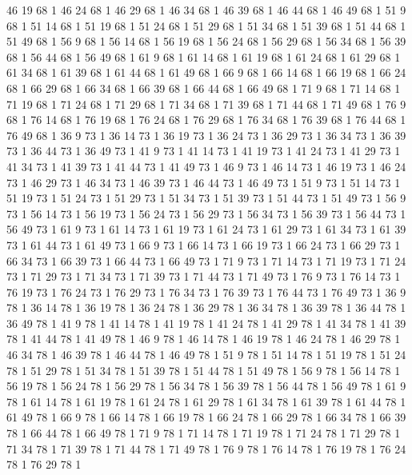 	46	19	68	1
	46	24	68	1
	46	29	68	1
	46	34	68	1
	46	39	68	1
	46	44	68	1
	46	49	68	1
	51	9	68	1
	51	14	68	1
	51	19	68	1
	51	24	68	1
	51	29	68	1
	51	34	68	1
	51	39	68	1
	51	44	68	1
	51	49	68	1
	56	9	68	1
	56	14	68	1
	56	19	68	1
	56	24	68	1
	56	29	68	1
	56	34	68	1
	56	39	68	1
	56	44	68	1
	56	49	68	1
	61	9	68	1
	61	14	68	1
	61	19	68	1
	61	24	68	1
	61	29	68	1
	61	34	68	1
	61	39	68	1
	61	44	68	1
	61	49	68	1
	66	9	68	1
	66	14	68	1
	66	19	68	1
	66	24	68	1
	66	29	68	1
	66	34	68	1
	66	39	68	1
	66	44	68	1
	66	49	68	1
	71	9	68	1
	71	14	68	1
	71	19	68	1
	71	24	68	1
	71	29	68	1
	71	34	68	1
	71	39	68	1
	71	44	68	1
	71	49	68	1
	76	9	68	1
	76	14	68	1
	76	19	68	1
	76	24	68	1
	76	29	68	1
	76	34	68	1
	76	39	68	1
	76	44	68	1
	76	49	68	1
	36	9	73	1
	36	14	73	1
	36	19	73	1
	36	24	73	1
	36	29	73	1
	36	34	73	1
	36	39	73	1
	36	44	73	1
	36	49	73	1
	41	9	73	1
	41	14	73	1
	41	19	73	1
	41	24	73	1
	41	29	73	1
	41	34	73	1
	41	39	73	1
	41	44	73	1
	41	49	73	1
	46	9	73	1
	46	14	73	1
	46	19	73	1
	46	24	73	1
	46	29	73	1
	46	34	73	1
	46	39	73	1
	46	44	73	1
	46	49	73	1
	51	9	73	1
	51	14	73	1
	51	19	73	1
	51	24	73	1
	51	29	73	1
	51	34	73	1
	51	39	73	1
	51	44	73	1
	51	49	73	1
	56	9	73	1
	56	14	73	1
	56	19	73	1
	56	24	73	1
	56	29	73	1
	56	34	73	1
	56	39	73	1
	56	44	73	1
	56	49	73	1
	61	9	73	1
	61	14	73	1
	61	19	73	1
	61	24	73	1
	61	29	73	1
	61	34	73	1
	61	39	73	1
	61	44	73	1
	61	49	73	1
	66	9	73	1
	66	14	73	1
	66	19	73	1
	66	24	73	1
	66	29	73	1
	66	34	73	1
	66	39	73	1
	66	44	73	1
	66	49	73	1
	71	9	73	1
	71	14	73	1
	71	19	73	1
	71	24	73	1
	71	29	73	1
	71	34	73	1
	71	39	73	1
	71	44	73	1
	71	49	73	1
	76	9	73	1
	76	14	73	1
	76	19	73	1
	76	24	73	1
	76	29	73	1
	76	34	73	1
	76	39	73	1
	76	44	73	1
	76	49	73	1
	36	9	78	1
	36	14	78	1
	36	19	78	1
	36	24	78	1
	36	29	78	1
	36	34	78	1
	36	39	78	1
	36	44	78	1
	36	49	78	1
	41	9	78	1
	41	14	78	1
	41	19	78	1
	41	24	78	1
	41	29	78	1
	41	34	78	1
	41	39	78	1
	41	44	78	1
	41	49	78	1
	46	9	78	1
	46	14	78	1
	46	19	78	1
	46	24	78	1
	46	29	78	1
	46	34	78	1
	46	39	78	1
	46	44	78	1
	46	49	78	1
	51	9	78	1
	51	14	78	1
	51	19	78	1
	51	24	78	1
	51	29	78	1
	51	34	78	1
	51	39	78	1
	51	44	78	1
	51	49	78	1
	56	9	78	1
	56	14	78	1
	56	19	78	1
	56	24	78	1
	56	29	78	1
	56	34	78	1
	56	39	78	1
	56	44	78	1
	56	49	78	1
	61	9	78	1
	61	14	78	1
	61	19	78	1
	61	24	78	1
	61	29	78	1
	61	34	78	1
	61	39	78	1
	61	44	78	1
	61	49	78	1
	66	9	78	1
	66	14	78	1
	66	19	78	1
	66	24	78	1
	66	29	78	1
	66	34	78	1
	66	39	78	1
	66	44	78	1
	66	49	78	1
	71	9	78	1
	71	14	78	1
	71	19	78	1
	71	24	78	1
	71	29	78	1
	71	34	78	1
	71	39	78	1
	71	44	78	1
	71	49	78	1
	76	9	78	1
	76	14	78	1
	76	19	78	1
	76	24	78	1
	76	29	78	1
